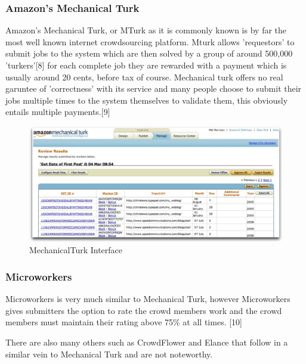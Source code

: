 \documentclass[11pt]{article}
\begin{document}
\subsubsection{Amazon's Mechanical Turk}
Amazon's Mechanical Turk, or MTurk as it is commonly known is by far the most well known
internet crowdsourcing platform. Mturk allows 'requestors' to submit jobs to the 
system which are then solved by a group of around 500,000 'turkers'[8] for each 
complete job they are rewarded with a payment which is usually around 20 cents, 
before tax of course. Mechanical turk offers no real garuntee of 'correctness' 
with its service and many people choose to submit their jobs multiple times to the
system themselves to validate them, this obviously entails multiple payments.[9]


\begin{figure}[htbp]
\begin{center}
\includegraphics[width=\linewidth]{images/mturkinterface.jpg}
\caption{MechanicalTurk Interface}
\label{default}
\end{center}
\end{figure}



\subsubsection{Microworkers}
Microworkers is very much similar to Mechanical Turk, however Microworkers gives submitters the 
option to rate the crowd members work and the crowd members must maintain their rating above 75\% at
all times. [10]

There are also many others such as CrowdFlower and Elance that follow in a similar vein to Mechanical Turk and
are not noteworthy.
\end{document}
